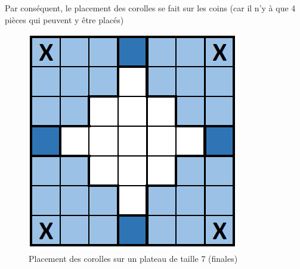 		Par conséquent, le placement des corolles se fait sur les coins (car il n'y à que 4 pièces qui peuvent y être placés)
		
		\begin{figure}[H]
			\centering
			\includegraphics[width=0.5\linewidth]{images/corolle_placement_finales}
			\caption{Placement des corolles sur un plateau de taille 7 (finales)}
			\label{fig:corolle_placement_finales}
		\end{figure}
